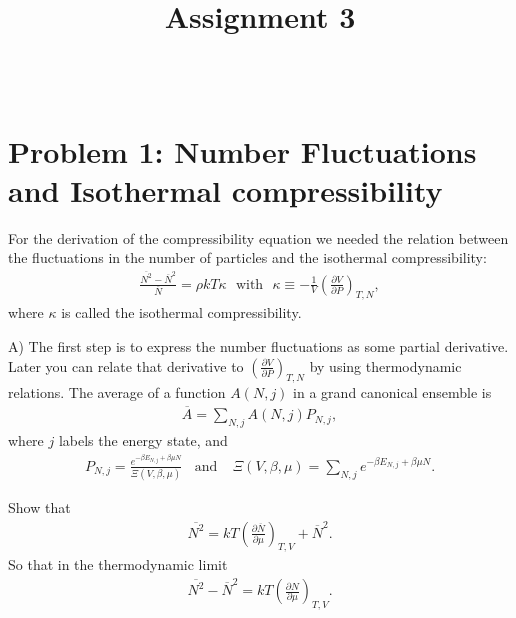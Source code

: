 \documentclass[paper=a4, fontsize=11pt]{scrartcl} %
\title{\vspace{-3cm}
\huge Assignment 3 \\ %
\horrule{2pt} \\ %
\vspace{-2cm}
}
\author{} %
\date{} %
\numberwithin{equation}{section} %
\numberwithin{figure}{section} %
\numberwithin{table}{section} %
\begin{document}
\maketitle %

\section*{Problem 1: Number Fluctuations and Isothermal compressibility}

For the derivation of the compressibility equation we needed the relation between the fluctuations in the number of
particles and the isothermal compressibility:
\begin{align*}
 \frac{\overline{N^2} - \overline{N}^2}{\overline{N}} = \rho k T \kappa
 \ \ \ \text{with} \ \ \ 
 \kappa \equiv - \frac{1}{V} \left(\frac{\partial V}{\partial P}\right)_{T,N},
\end{align*}
where $\kappa$ is called the isothermal compressibility.



A) \hspace{.5cm} The first step is to express the number fluctuations as some partial derivative. Later you can 
relate that derivative to $\left( \frac{\partial V}{\partial P} \right)_{T,N}$ by using thermodynamic relations.
The average of a function $A(N,j)$ in a grand canonical ensemble is
\begin{align*}
 \overline{A} = \sum_{N,j} A(N,j) P_{N,j},
\end{align*}
where $j$ labels the energy state, and 
\begin{align*}
 P_{N,j} = \frac{e^{-\beta E_{N,j}+\beta \mu N}}{\Xi(V,\beta,\mu)}
\ \ \ \ \text{and} \ \ \ \ \
\Xi(V,\beta,\mu)  = \sum_{N,j} e^{-\beta E_{N,j}+\beta \mu N}.
\end{align*}

Show that
\begin{align*}
 \overline{N^2}  = kT \left( \frac{\partial \overline{N}}{\partial \mu}\right)_{T,V} + 
 \overline{N}^2.
\end{align*}
So that in the thermodynamic limit
\begin{align*}
  \overline{N^2}- \overline{N}^2  = kT \left( \frac{\partial N}{\partial \mu}\right)_{T,V}.
\end{align*}
\end{document}
